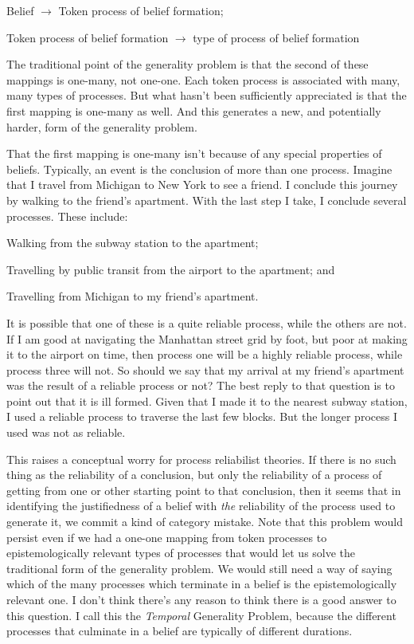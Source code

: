 \documentclass[11pt,oneside]{book}
\begin{document}
\begin{enumerate*}
\item Belief $\rightarrow$ Token process of belief formation;
\item Token process of belief formation $\rightarrow$ type of process of belief formation
\end{enumerate*}

\noindent The traditional point of the generality problem is that the second of these mappings is one-many, not one-one. Each token process is associated with many, many types of processes. But what hasn't been sufficiently appreciated is that the first mapping is one-many as well. And this generates a new, and potentially harder, form of the generality problem.

That the first mapping is one-many isn't because of any special properties of beliefs. Typically, an event is the conclusion of more than one process. Imagine that I travel from Michigan to New York to see a friend. I conclude this journey by walking to the friend's apartment. With the last step I take, I conclude several processes. These include:

\begin{enumerate*}
\item Walking from the subway station to the apartment;
\item Travelling by public transit from the airport to the apartment; and
\item Travelling from Michigan to my friend's apartment.
\end{enumerate*}

\noindent It is possible that one of these is a quite reliable process, while the others are not. If I am good at navigating the Manhattan street grid by foot, but poor at making it to the airport on time, then process one will be a highly reliable process, while process three will not. So should we say that my arrival at my friend's apartment was the result of a reliable process or not? The best reply to that question is to point out that it is ill formed. Given that I made it to the nearest subway station, I used a reliable process to traverse the last few blocks. But the longer process I used was not as reliable.

This raises a conceptual worry for process reliabilist theories. If there is no such thing as the reliability of a conclusion, but only the reliability of a process of getting from one or other starting point to that conclusion, then it seems that in identifying the justifiedness of a belief with \textit{the} reliability of the process used to generate it, we commit a kind of category mistake. Note that this problem would persist even if we had a one-one mapping from token processes to epistemologically relevant types of processes that would let us solve the traditional form of the generality problem. We would still need a way of saying which of the many processes which terminate in a belief is the epistemologically relevant one. I don't think there's any reason to think there is a good answer to this question. I call this the \textit{Temporal} Generality Problem, because the different processes that culminate in a belief are typically of different durations.
\end{document}
